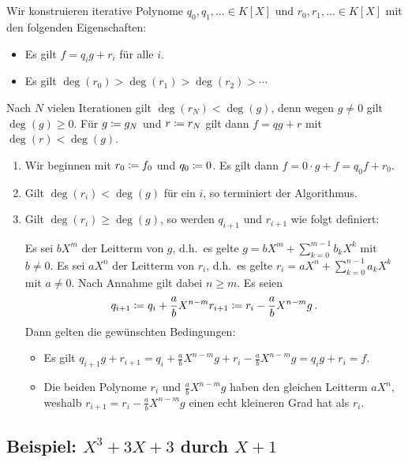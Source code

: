 \section{}

Wir konstruieren iterative Polynome $q_0, q_1, \dotsc \in K[X]$ und $r_0, r_1, \dotsc \in K[X]$ mit den folgenden Eigenschaften:
\begin{itemize}
  \item
    Es gilt $f = q_i g + r_i$ für alle $i$.
  \item
    Es gilt $\deg(r_0) > \deg(r_1) > \deg(r_2) > \dotsb$
\end{itemize}
Nach $N$ vielen Iterationen gilt $\deg(r_N) < \deg(g)$, denn wegen $g \neq 0$ gilt $\deg(g) \geq 0$.
Für $g \coloneqq g_N$ und $r \coloneqq r_N$ gilt dann $f = qg + r$ mit $\deg(r) < \deg(g)$.

\begin{enumerate}
  \item
    Wir beginnen mit $r_0 \coloneqq f_0$ und $q_0 \coloneqq 0$.
    Es gilt dann $f = 0 \cdot g + f = q_0 f + r_0$.
  \item
    Gilt $\deg(r_i) < \deg(g)$ für ein $i$, so terminiert der Algorithmus.
  \item
    Gilt $\deg(r_i) \geq \deg(g)$, so werden $q_{i+1}$ und $r_{i+1}$ wie folgt definiert:
    
    Es sei $b X^m$ der Leitterm von $g$, d.h.\ es gelte $g = b X^m + \sum_{k=0}^{m-1} b_k X^k$ mit $b \neq 0$.
    Es sei $a X^n$ der Leitterm von $r_i$, d.h.\ es gelte $r_i = a X^n + \sum_{k=0}^{n-1} a_k X^k$ mit $a \neq 0$.
    Nach Annahme gilt dabei $n \geq m$.
    Es seien
    \[
      q_{i+1} \coloneqq q_i + \frac{a}{b} X^{n-m}
      r_{i+1} \coloneqq r_i - \frac{a}{b} X^{n-m} g \,.
    \]
    Dann gelten die gewünschten Bedingungen:
    \begin{itemize}
      \item
        Es gilt $q_{i+1} g + r_{i+1} = q_i + \frac{a}{b} X^{n-m} g + r_i - \frac{a}{b} X^{n-m} g = q_i g + r_i = f$.
      \item
        Die beiden Polynome $r_i$ und $\frac{a}{b} X^{n-m} g$ haben den gleichen Leitterm $a X^n$, weshalb $r_{i+1} = r_i - \frac{a}{b} X^{n-m} g$ einen echt kleineren Grad hat als $r_i$.
    \end{itemize}
\end{enumerate}


\subsection*{Beispiel: $X^3 + 3X + 3$ durch $X + 1$}

